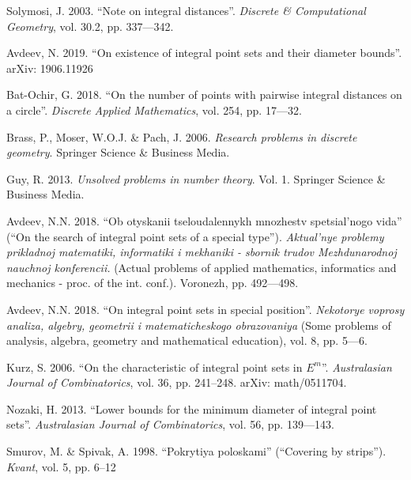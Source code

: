 \begin{engbibliography}{99}
	Solymosi, J. 2003.
	“Note on integral distances”.
	\emph{Discrete \& Computational Geometry}, vol. 30.2, pp. 337—342.

	Avdeev, N. 2019.
	“On existence of integral point sets and their diameter bounds”.
	arXiv: 1906.11926

	Bat-Ochir, G. 2018.
	“On the number of points with pairwise integral distances on a circle”.
	\emph{Discrete Applied Mathematics}, vol. 254, pp. 17—32.

	Brass, P., Moser, W.O.J. \& Pach, J. 2006.
	\emph{Research problems in discrete geometry}. Springer Science \& Business Media.

	Guy, R. 2013.
	\emph{Unsolved problems in number theory}. Vol. 1.
	Springer Science \& Business Media.

	Avdeev, N.N. 2018.
	“Ob otyskanii tseloudalennykh mnozhestv spetsial'nogo vida”
	(``On the search of integral point sets of a special type'').
	\emph{
		Aktual'nye problemy prikladnoj matematiki, informatiki i mekhaniki
		- sbornik trudov Mezhdunarodnoj nauchnoj konferencii.
	}
	(Actual problems of applied mathematics, informatics and mechanics
	- proc. of the int. conf.).
	Voronezh, pp. 492—498.

	Avdeev, N.N. 2018.
	“On integral point sets in special position”.
	\emph{Nekotorye voprosy analiza, algebry, geometrii i matematicheskogo obrazovaniya}
	(Some problems of analysis, algebra, geometry and mathematical education), vol. 8, pp. 5—6.

	Kurz, S. 2006.
	“On the characteristic of integral point sets in $E^m$”.
	\emph{Australasian Journal of Combinatorics}, vol. 36, pp. 241–248.
	arXiv: math/0511704.

	Nozaki, H. 2013.
	“Lower bounds for the minimum diameter of integral point sets”.
	\emph{Australasian Journal of Combinatorics}, vol. 56, pp. 139—143.

	Smurov, M. \& Spivak, A. 1998.
	“Pokrytiya poloskami” (``Covering by strips'').
	\emph{Kvant}, vol. 5, pp. 6--12

\end{engbibliography}
